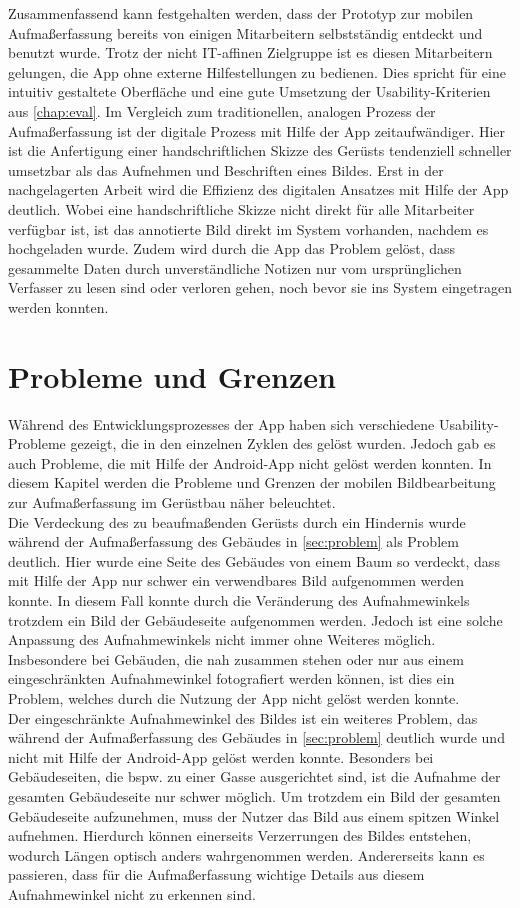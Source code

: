 Zusammenfassend kann festgehalten werden, dass der Prototyp zur mobilen Aufmaßerfassung bereits von einigen Mitarbeitern selbstständig entdeckt und benutzt wurde.
Trotz der nicht IT-affinen Zielgruppe ist es diesen Mitarbeitern gelungen, die App ohne externe Hilfestellungen zu bedienen.
Dies spricht für eine intuitiv gestaltete Oberfläche und eine gute Umsetzung der Usability-Kriterien aus \autoref{chap:eval}.
Im Vergleich zum traditionellen, analogen Prozess der Aufmaßerfassung ist der digitale Prozess mit Hilfe der App zeitaufwändiger.
Hier ist die Anfertigung einer handschriftlichen Skizze des Gerüsts tendenziell schneller umsetzbar als das Aufnehmen und Beschriften eines Bildes.
Erst in der nachgelagerten Arbeit wird die Effizienz des digitalen Ansatzes mit Hilfe der App deutlich.
Wobei eine handschriftliche Skizze nicht direkt für alle Mitarbeiter verfügbar ist, ist das annotierte Bild direkt im System vorhanden, nachdem es hochgeladen wurde.
Zudem wird durch die App das Problem gelöst, dass gesammelte Daten durch unverständliche Notizen nur vom ursprünglichen Verfasser zu lesen sind oder verloren gehen, noch bevor sie ins System eingetragen werden konnten.

\section{Probleme und Grenzen}
Während des Entwicklungsprozesses der App haben sich verschiedene Usability-Probleme gezeigt, die in den einzelnen Zyklen des \hcdp{} gelöst wurden.
Jedoch gab es auch Probleme, die mit Hilfe der Android-App nicht gelöst werden konnten.
In diesem Kapitel werden die Probleme und Grenzen der mobilen Bildbearbeitung zur Aufmaßerfassung im Gerüstbau näher beleuchtet. \\

Die Verdeckung des zu beaufmaßenden Gerüsts durch ein Hindernis wurde während der Aufmaßerfassung des Gebäudes in \autoref{sec:problem} als Problem deutlich.
Hier wurde eine Seite des Gebäudes von einem Baum so verdeckt, dass mit Hilfe der App nur schwer ein verwendbares Bild aufgenommen werden konnte.
In diesem Fall konnte durch die Veränderung des Aufnahmewinkels trotzdem ein Bild der Gebäudeseite aufgenommen werden.
Jedoch ist eine solche Anpassung des Aufnahmewinkels nicht immer ohne Weiteres möglich.
Insbesondere bei Gebäuden, die nah zusammen stehen oder nur aus einem eingeschränkten Aufnahmewinkel fotografiert werden können, ist dies ein Problem, welches durch die Nutzung der App nicht gelöst werden konnte. \\

Der eingeschränkte Aufnahmewinkel des Bildes ist ein weiteres Problem, das während der Aufmaßerfassung des Gebäudes in \autoref{sec:problem} deutlich wurde und nicht mit Hilfe der Android-App gelöst werden konnte.
Besonders bei Gebäudeseiten, die bspw. zu einer Gasse ausgerichtet sind, ist die Aufnahme der gesamten Gebäudeseite nur schwer möglich.
Um trotzdem ein Bild der gesamten Gebäudeseite aufzunehmen, muss der Nutzer das Bild aus einem spitzen Winkel aufnehmen.
Hierdurch können einerseits Verzerrungen des Bildes entstehen, wodurch Längen optisch anders wahrgenommen werden.
Andererseits kann es passieren, dass für die Aufmaßerfassung wichtige Details aus diesem Aufnahmewinkel nicht zu erkennen sind.

